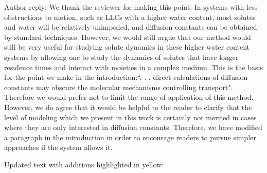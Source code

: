 \documentclass{article}
\begin{document}
\begin{enumerate}[label={Comment \theenumi :}, leftmargin=3.9\parindent]
    Author reply: We thank the reviewer for making this point. In systems with less obstructions
    to motion, such as LLCs with a higher water content, most solutes and water will be 
    relatively unimpeded, and diffusion constants can be obtained by standard techniques.    
    However, we would still argue that our method would still be very useful for studying
    solute dynamics in these higher water content systems by allowing one to study the dynamics 
    of solutes that have longer residence times and interact with moieties in a complex medium. %
    This is the basis for the point we make in the introduction:``. . . direct calculations 
    of diffusion constants may obscure the molecular mechanisms controlling transport". Therefore
    we would prefer not to limit the range of application of this method. 
    However, we do agree that it would be helpful to the reader to clarify that the level of modeling 
    which we present in this work is certainly not merited in cases where they are only interested in
    diffusion constants. Therefore, we have modified a paragraph in the introduction in order to
    encourage readers to pursue simpler approaches if the system allows it.
    
    Updated text with additions highlighted in yellow:
    

\end{enumerate}
\end{document}
